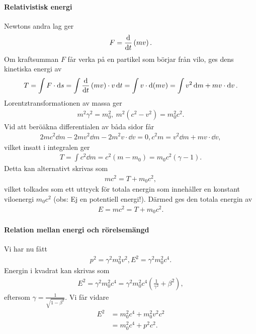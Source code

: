 \paragraph{Relativistisk energi}
Newtons andra lag ger
\begin{align*}
	F = \dv{t}\left(mv\right).
\end{align*}
Om kraftsumman $F$ får verka på en partikel som börjar från vilo, ges dens kinetiska energi av
\begin{align*}
	T = \int F\cdot\dd{s} = \int\dv{t}\left(mv\right)\cdot v\dd{t} = \int v\cdot\dd{(mv)} = \int v^{2}\dd{m} + mv\cdot\dd{v}.
\end{align*}
Lorentztransformationen av massa ger
\begin{align*}
	m^{2}\gamma^{2} = m_{0}^{2},\ m^{2}(c^{2} - v^{2}) = m_{0}^{2}c^{2}.
\end{align*}
Vid att beröäkna differentialen av båda sidor får
\begin{align*}
	2mc^{2}\dd{m} - 2mv^{2}\dd{m} - 2m^{2}v\cdot\dd{v} = 0, c^{2}m = v^{2}\dd{m} + mv\cdot\dd{v},
\end{align*}
vilket insatt i integralen ger
\begin{align*}
	T = \int c^{2}\dd{m} = c^{2}(m - m_{0}) = m_{0}c^{2}(\gamma - 1).
\end{align*}
Detta kan alternativt skrivas som
\begin{align*}
	mc^{2} = T + m_{0}c^{2},
\end{align*}
vilket tolkades som ett uttryck för totala energin som innehåller en konstant viloenergi $m_{0}c^{2}$ (obs: Ej en potentiell energi!). Därmed ges den totala energin av
\begin{align*}
	E = mc^{2} = T + m_{0}c^{2}.
\end{align*}

\paragraph{Relation mellan energi och rörelsemängd}
Vi har nu fått
\begin{align*}
	p^{2} = \gamma^{2}m_{0}^{2}v^{2}, E^{2} = \gamma^{2}m_{0}^{2}c^{4}.
\end{align*}
Energin i kvadrat kan skrivas som
\begin{align*}
	E^{2} = \gamma^{2}m_{0}^{2}c^{4} = \gamma^{2}m_{0}^{2}c^{4}\left(\frac{1}{\gamma^{2}} + \beta^{2}\right),
\end{align*}
eftersom $\gamma = \frac{1}{\sqrt{1 - \beta^{2}}}$. Vi får vidare
\begin{align*}
	E^{2} &= m_{0}^{2}c^{4} + m_{0}^{2}v^{2}c^{2} \\
	      &= m_{0}^{2}c^{4} + p^{2}c^{2}.
\end{align*}